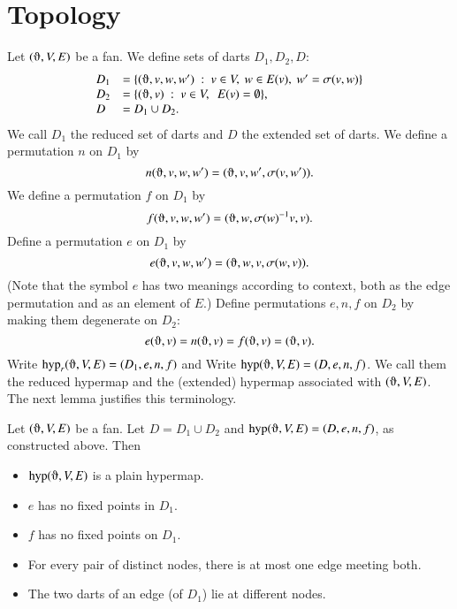 \section{Topology}

Let $(\orgn,V,E)$ be a fan.  We define sets of darts $D_1,D_2,D$:
    $$
    \begin{array}{lll}
    D_1 &= \{(\orgn,v,w,w')\mid v\in V,\ w\in E(v),\ w' = \sigma(v,w)\}\\
    D_2 &= \{(\orgn,v) \mid v\in V,\ \ E(v) = \emptyset\},\\
    D   &= D_1\cup D_2.
    \end{array}
    $$
We call $D_1$ the reduced set of darts and $D$ the extended set of darts.
%
We define a permutation $n$ on $D_1$ by
    $$n(\orgn,v,w,w') = (\orgn,v,w',\sigma(v,w')).$$
We define a permutation $f$ on $D_1$ by
    $$
    f (\orgn,v,w,w') = (\orgn,w,\sigma(w)^{-1} v,v).
    $$
Define a permutation $e$ on $D_1$ by
    $$
    e (\orgn,v,w,w') = (\orgn,w,v,\sigma(w,v)).
    $$
(Note that the symbol $e$ has two meanings according to context, both
as the edge permutation and as an element of $E$.)
Define permutations $e,n,f$ on $D_2$ by making them degenerate on $D_2$:
    $$
    e (\orgn,v) = n(\orgn,v) = f(\orgn,v) = (\orgn,v).
    $$
Write $\op{hyp}_r(\orgn,V,E)=(D_1,e,n,f)$ and
Write $\op{hyp}(\orgn,V,E)=(D,e,n,f)$.  We call them the reduced hypermap
and the (extended) hypermap associated with $(\orgn,V,E)$.  The next
lemma justifies this terminology.



\begin{lemma}
Let $(\orgn,V,E)$ be a fan.  Let $D = D_1\cup D_2$
and $\op{hyp}(\orgn,V,E) = (D,e,n,f)$, as constructed above.  Then
    \begin{itemize}
    \item $\op{hyp}(\orgn,V,E)$ is a plain hypermap.
    \item  $e$ has no fixed
points in $D_1$.
    \item  $f$ has no fixed points on $D_1$.
    \item For every pair of distinct nodes, there is at most one
    edge meeting both.
    \item The two darts of an edge (of $D_1$) lie at different nodes.
    \end{itemize}
\end{lemma}

